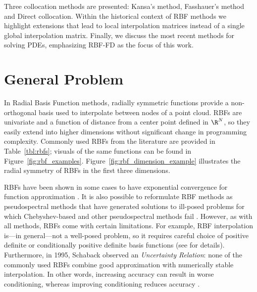 \documentclass{report}
\begin{document}
{%
Three collocation methods are presented: Kansa's method, Fasshauer's method and Direct collocation. Within the historical context of RBF methods we highlight extensions that lead to local interpolation matrices instead of a single global interpolation matrix. Finally, we discuss the most recent methods for solving PDEs, emphasizing RBF-FD as the focus of this work. 

\section{General Problem}

In Radial Basis Function methods, radially symmetric functions provide a non-orthogonal basis used to interpolate between 
nodes of a point cloud. RBFs are univariate and a function of distance from a center point defined in $\R^N$, so 
they easily extend into higher dimensions without significant change in programming complexity. Commonly used RBFs from the literature are provided in Table~\ref{tbl:rbfs}; visuals of the same functions can be found in Figure~\ref{fig:rbf_examples}. Figure~\ref{fig:rbf_dimension_example} illustrates the radial symmetry of RBFs in the first three dimensions. 





RBFs have been shown in 
some cases to have exponential convergence for function approximation \cite{Fasshauer2007}. It is also possible to 
reformulate RBF methods as pseudospectral methods that have 
generated solutions to ill-posed problems for which Chebyshev-based and other pseudospectral methods 
fail \cite{Fasshauer2006}. However, as with all methods, RBFs come with certain limitations. For example, RBF interpolation is---in general---not a well-posed problem, so it requires careful choice of positive definite or conditionally positive definite basis functions (see \cite{Iske2004, Fasshauer2007} for details). Furthermore, in 1995,  
Schaback \cite{Schaback1995} observed an \emph{Uncertainty Relation}: none of the commonly used RBFs combine 
good approximation with numerically stable interpolation. In other words, increasing accuracy can result in worse conditioning, 
whereas improving conditioning reduces accuracy \cite{Schaback1995, Iske2004}. 

}
\end{document}
